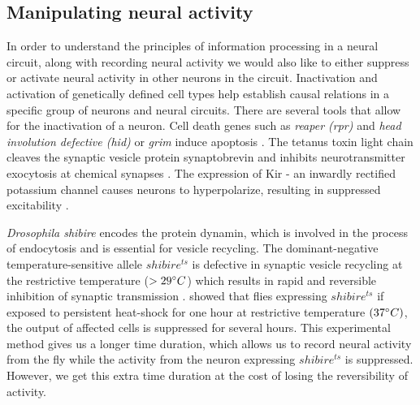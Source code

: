 \subsection{Manipulating neural activity}

In order to understand the principles of information processing in a neural circuit, along with recording neural activity we would also like to either suppress or activate neural activity in other neurons in the circuit. Inactivation and activation of genetically defined cell types help establish causal relations in a specific group of neurons and neural circuits. There are several tools that allow for the inactivation of a neuron. Cell death genes such as \textit{reaper (rpr)} and \textit{head involution defective (hid)} or \textit{grim} induce apoptosis \parencite{Chen1996, Grether1995}.  The tetanus toxin light chain cleaves the synaptic vesicle protein synaptobrevin and inhibits neurotransmitter exocytosis at chemical synapses \parencite{Sweeney1995}. The expression of Kir - an inwardly rectified potassium channel causes neurons to hyperpolarize, resulting in suppressed excitability \parencite{Johns1999}. %

\textit{Drosophila shibire} encodes the protein dynamin, which is involved in the process of endocytosis and is essential for vesicle recycling. The dominant-negative temperature-sensitive allele $shibire^{ts}$ is defective in synaptic vesicle recycling at the restrictive temperature ($>29\degree C$) which results in rapid and reversible inhibition of synaptic transmission \parencite{Kitamoto2001}. \cite{Joesch2010} showed that flies expressing $shibire^{ts}$ if exposed to persistent heat-shock for one hour at restrictive temperature $(37\degree C)$, the output of affected cells is suppressed for several hours. This experimental method gives us a longer time duration, which allows us to record neural activity from the fly while the activity from the neuron expressing $shibire^{ts}$ is suppressed. However, we get this extra time duration at the cost of losing the reversibility of activity.

